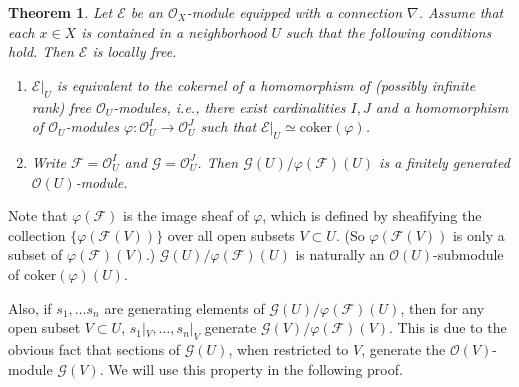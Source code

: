 \documentclass[12pt,b5paper,notitlepage]{report}
\theoremstyle{definition}
\theoremstyle{plain}
\newtheorem{thm}[df]{Theorem}
\newcommand{\scr}{\mathscr}
\newcommand{\mbb}{\mathbb}
\newcommand{\coker}{\mathrm{coker}}
\numberwithin{equation}{section}
\begin{document}


\begin{thm}\label{lb66}
Let $\scr E$ be an $\scr O_X$-module equipped with a connection $\nabla$. Assume that  each $x\in X$ is contained in a neighborhood $U$ such that the following conditions hold. Then $\scr E$ is locally free.
\begin{enumerate}[label=(\alph*)]
\item $\scr E|_U$ is equivalent to the cokernel of a homomorphism of (possibly infinite rank) free $\scr O_U$-modules, i.e., there exist cardinalities $I,J$ and a homomorphism of $\scr O_U$-modules $\varphi:\scr O_U^I\rightarrow\scr O_U^J$  such that $\scr E|_U\simeq\mathrm{coker}(\varphi)$.
\item Write $\scr F=\scr O^I_U$ and $\scr G=\scr O^J_U$. Then $\scr G(U)/\varphi(\scr F)(U)$ is a finitely generated $\scr O(U)$-module. 
\end{enumerate}
\end{thm}


Note that  $\varphi(\scr F)$ is the image sheaf of $\varphi$, which is defined by sheafifying the collection $\{\varphi(\scr F(V))\}$ over all open subsets $V\subset U$. (So $\varphi(\scr F(V))$ is only a subset of $\varphi(\scr F)(V)$.) $\scr G(U)/\varphi(\scr F)(U)$ is naturally an $\scr O(U)$-submodule of $\coker(\varphi)(U)$.

Also, if $s_1,\dots s_n$ are generating elements of $\scr G(U)/\varphi(\scr F)(U)$, then for any open subset $V\subset U$, $s_1|_V,\dots,s_n|_V$ generate $\scr G(V)/\varphi(\scr F)(V)$. This is due to the obvious fact that sections of $\scr G(U)$, when restricted to $V$, generate the $\scr O(V)$-module $\scr G(V)$. We will use this property in the following proof.
 
\end{document}
